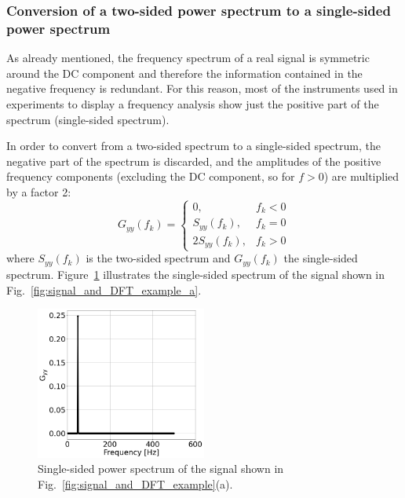 \subsubsection*{Conversion of a two-sided power spectrum to a single-sided power spectrum} %
As already mentioned, the frequency spectrum of a real signal is symmetric around the DC component and therefore the information contained in the negative frequency is redundant. For this reason, most of the instruments used in experiments to display a frequency analysis show just the positive part of the spectrum (single-sided spectrum).  

In order to convert from a two-sided spectrum to a single-sided spectrum, the negative part of the spectrum is discarded, and the amplitudes of the positive frequency components (excluding the DC component, so for $f > 0$) are multiplied by a factor 2:
\begin{equation}\label{eq:two-sided_2_single-sided}
        G_{yy}(f_k) = \left\{\begin{matrix}
  0, & f_k < 0 \\ 
    S_{yy}(f_k), & f_k=0  \\
     2 S_{yy}(f_k), & f_k > 0 
    \end{matrix}\right.
\end{equation}
where $S_{yy}(f_k)$ is the two-sided spectrum and $G_{yy}(f_k)$ the single-sided spectrum. Figure~\ref{fig:psd_example_single_sided} illustrates the single-sided spectrum of the signal shown in Fig.~\ref{fig:signal_and_DFT_example_a}.

\begin{figure}[!ht]
    \centering         
    \includegraphics[width=0.5\textwidth]{./images/app_B/simple_signal_1freq_psd_single_sided_example.png}
        \caption{Single-sided power spectrum of the signal shown in Fig.~\ref{fig:signal_and_DFT_example}(a).}
        \label{fig:psd_example_single_sided}
\end{figure}

